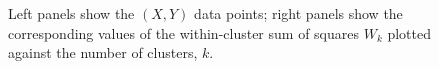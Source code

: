 \documentclass[12pt]{article}
\DeclareMathOperator*{\var}{var}
\begin{document}
\begin{figure}
\begin{minipage}{\linewidth}
\begin{minipage}{0.45\linewidth}
  \end{minipage}
\end{minipage}
\caption{Left panels show the $(X,Y)$ data points; right panels
  show the corresponding values of the within-cluster sum of squares $W_k$
plotted against the number of clusters, $k$.}
\label{fig:elbow}
\end{figure}



\end{document}
